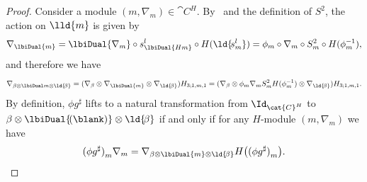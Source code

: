 \begin{proof}
  Consider a module \((m, \nabla_m) \in \cat{C}^H\).
  By~\cite[Theorem~3.8(a)]{Bruguieres2007} and the definition of \(S^2\),
  the action on \(\lld{m}\) is given by
  \[
    \nabla_{\lbiDual{m}}
    = \lbiDual{\nabla_m} \circ s^l_{\lbiDual{Hm}} \circ H(\ld{\!{}s^l_m})
    = \phi_m \circ \nabla_m \circ S^2_m \circ H(\phi^{-1}_m),
  \]
  and therefore we have
  \[
    \nabla_{\beta \otimes \lbiDual m \otimes \ld{\!\beta}}
    = (\nabla_{\beta} \otimes \nabla_{\lbiDual{m}} \otimes \nabla_{\ld{\!\beta}}) H_{3; 1,m,1}
    = (\nabla_{\beta} \otimes \phi_m \nabla_m S^2_m H(\phi^{-1}_m) \otimes \nabla_{\ld{\!\beta}}) H_{3; 1,m,1}.
  \]
  By definition, \(\phi g^{\sharp}\) lifts to a natural transformation from \(\Id_{\cat{C}^H}\) to \(\beta \otimes \lbiDual{\!(\blank)} \otimes \ld{\!\beta}\)
  if and only if for any \(H\)\hyp{}module \((m, \nabla_m)\) we have
  \begin{equation} \label{eq: sharpbeta-lifts}
    {(\phi g^{\sharp})}_m \nabla_m = \nabla_{\beta \otimes \lbiDual{m} \otimes \ld{\!\beta}}H \big( {(\phi g^{\sharp})}_m \big).
  \end{equation}


\end{proof}
